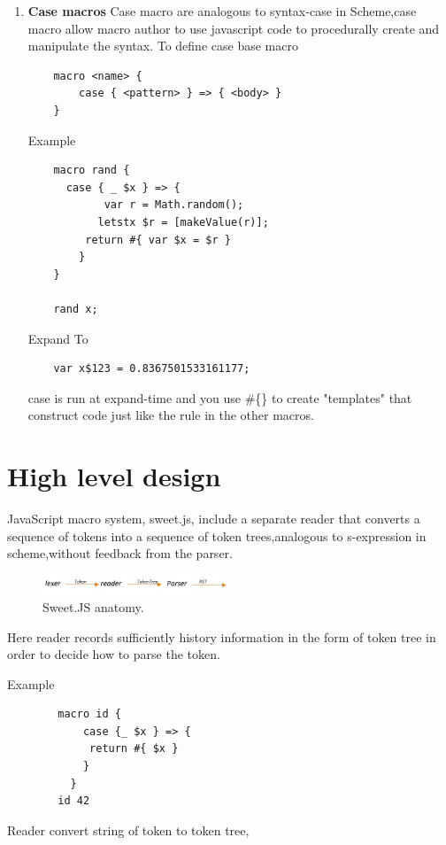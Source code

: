 \begin{enumerate}
\item {\bf Case macros }
Case macro are analogous to syntax-case in Scheme,case macro allow macro author to use javascript code to procedurally create and manipulate the syntax.
To define case base macro
\begin{lstlisting}
	macro <name> {
  		case { <pattern> } => { <body> }
	}
\end{lstlisting}
Example
\begin{lstlisting}
	macro rand {
  	  case { _ $x } => {
    	    var r = Math.random();
     	   letstx $r = [makeValue(r)];
      	 return #{ var $x = $r }
   		}
	}

	rand x;
\end{lstlisting}

Expand To

\begin{lstlisting}
	var x$123 = 0.8367501533161177;
\end{lstlisting}
case is run at expand-time and you use \#\{\} to create "templates" that construct code just like the rule in the other macros.

\end{enumerate}

\section{High level design}

JavaScript macro system, sweet.js, include a separate reader that converts a sequence of tokens into a sequence of token trees,analogous to s-expression in scheme,without feedback from the parser.

\begin{figure}[htb]
\centering
\includegraphics[width=0.5\textwidth]{images/Tokenizer.jpg}
\caption{Sweet.JS anatomy.} 
\label{fig:Tokenizer}
\end{figure}

Here reader records sufficiently history information in the form of token tree in order to decide how to parse the token. 

Example

\begin{lstlisting}
		macro id {
  			case {_ $x } => {
   			 return #{ $x }
  			}
		  }
		id 42
\end{lstlisting}
Reader convert string of token to token tree, 


